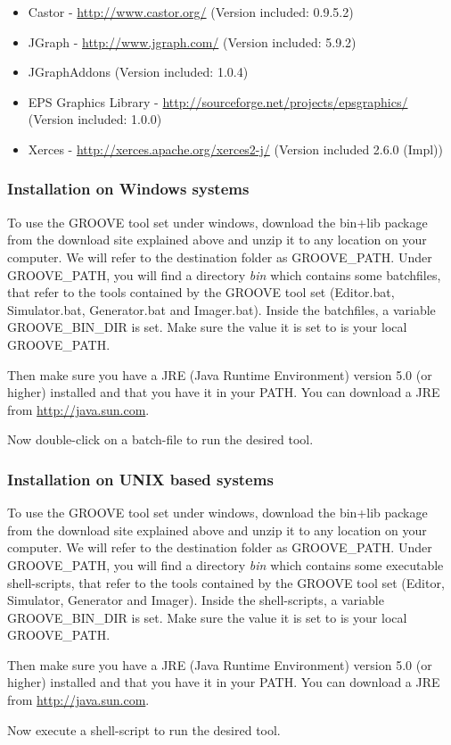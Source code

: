 \begin{itemize}
\item Castor - \url{http://www.castor.org/} (Version included: 0.9.5.2)
\item JGraph - \url{http://www.jgraph.com/} (Version included: 5.9.2)
\item JGraphAddons (Version included: 1.0.4)
\item EPS Graphics Library - \url{http://sourceforge.net/projects/epsgraphics/} (Version included: 1.0.0)
\item Xerces - \url{http://xerces.apache.org/xerces2-j/} (Version included 2.6.0 (Impl))
\end{itemize}


\subsubsection{Installation on Windows systems}

To use the GROOVE tool set under windows, download the bin+lib package from the download site explained above and unzip it to any location on your computer. We will refer to the destination folder as GROOVE\_PATH. Under GROOVE\_PATH, you will find a directory \emph{bin} which contains some batchfiles, that refer to the tools contained by the GROOVE tool set (Editor.bat, Simulator.bat, Generator.bat and Imager.bat). Inside the batchfiles, a variable GROOVE\_BIN\_DIR is set. Make sure the value it is set to is your local GROOVE\_PATH.

Then make sure you have a JRE (Java Runtime Environment) version 5.0 (or higher) installed and that you have it in your PATH. You can download a JRE from \url{http://java.sun.com}.

Now double-click on a batch-file to run the desired tool.

\subsubsection{Installation on UNIX based systems}

To use the GROOVE tool set under windows, download the bin+lib package from the download site explained above and unzip it to any location on your computer. We will refer to the destination folder as GROOVE\_PATH. Under GROOVE\_PATH, you will find a directory \emph{bin} which contains some executable shell-scripts, that refer to the tools contained by the GROOVE tool set (Editor, Simulator, Generator and Imager). Inside the shell-scripts, a variable GROOVE\_BIN\_DIR is set. Make sure the value it is set to is your local GROOVE\_PATH.

Then make sure you have a JRE (Java Runtime Environment) version 5.0 (or higher) installed and that you have it in your PATH. You can download a JRE from \url{http://java.sun.com}.

Now execute a shell-script to run the desired tool.
